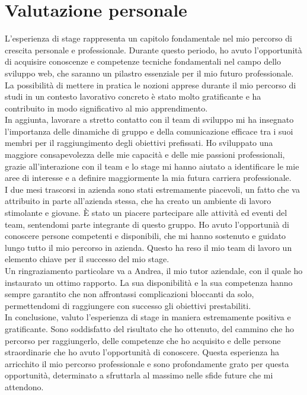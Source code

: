 
\section{Valutazione personale}

L'esperienza di stage rappresenta un capitolo fondamentale nel mio percorso di crescita personale e professionale. Durante questo periodo, ho avuto l'opportunità di acquisire conoscenze e competenze tecniche 
fondamentali nel campo dello sviluppo web, che saranno un pilastro essenziale per il mio futuro professionale. La possibilità di mettere in pratica le nozioni apprese durante il mio percorso di studi in un contesto
lavorativo concreto è stato molto gratificante e ha contribuito in modo significativo al mio apprendimento.\\
In aggiunta, lavorare a stretto contatto con il team di sviluppo mi ha insegnato l'importanza delle dinamiche di gruppo e della comunicazione efficace tra i suoi membri per il raggiungimento degli obiettivi prefissati.
Ho sviluppato una maggiore consapevolezza delle mie capacità e delle mie passioni professionali, grazie all'interazione con il team e lo stage mi hanno aiutato a identificare le mie aree di interesse e a definire 
maggiormente la mia futura carriera professionale.\\
I due mesi trascorsi in azienda sono stati estremamente piacevoli, un fatto che va attribuito in parte all'azienda stessa, che ha creato un ambiente di lavoro stimolante e giovane.
È stato un piacere partecipare alle attività ed eventi del team, sentendomi parte integrante di questo gruppo. Ho avuto l'opportunià di conoscere persone competenti e disponibili, che mi hanno sostenuto e guidato 
lungo tutto il mio percorso in azienda. Questo ha reso il mio team di lavoro un elemento chiave per il successo del mio stage.\\
Un ringraziamento particolare va a Andrea, il mio tutor aziendale, con il quale ho instaurato un ottimo rapporto. La sua disponibilità e la sua competenza hanno sempre garantito che non affrontassi complicazioni bloccanti da solo, 
permettendomi di raggiungere con successo gli obiettivi prestabiliti.\\

In conclusione, valuto l'esperienza di stage in maniera estremamente positiva e gratificante. Sono soddisfatto del risultato che ho ottenuto, del cammino che ho percorso per raggiungerlo, delle competenze 
che ho acquisito e delle persone straordinarie che ho avuto l'opportunità di conoscere. Questa esperienza ha arricchito il mio percorso professionale e sono profondamente grato per questa opportunità, 
determinato a sfruttarla al massimo nelle sfide future che mi attendono.